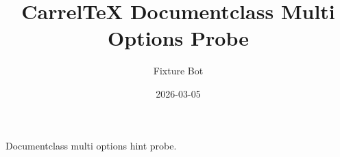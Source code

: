 \documentclass[ openright , draft , twoside , openright ]{classoptsmulti}
\title{CarrelTeX Documentclass Multi Options Probe}
\author{Fixture Bot}
\date{2026-03-05}
\begin{document}
\maketitle

Documentclass multi options hint probe.
\end{document}
